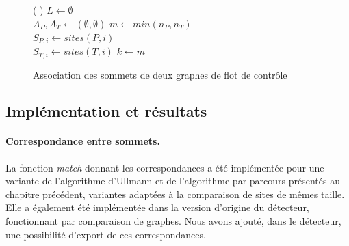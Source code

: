 \begin{figure}[h]
\begin{algorithm}[H]
\DontPrintSemicolon
\caption{Association des sommets de deux graphes de flot de contrôle}
\SetAlgoLined
{}
\Fn(
){}{
$L\leftarrow \emptyset$\\
$A_P, A_T \leftarrow (\emptyset, \emptyset)$ 
$m\leftarrow min(n_P, n_T)$\\
 {
  $S_{P, i}\leftarrow sites(P, i)$\\
  $S_{T, i}\leftarrow sites(T, i)$
}
$k\leftarrow m$\\
}
\label{algo:correspondance_fine}
\end{algorithm}
\end{figure}

\subsection{Implémentation et résultats}
\paragraph{Correspondance entre sommets.}
La fonction \emph{match} donnant les correspondances a été implémentée pour une variante de l'algorithme d'Ullmann et de l'algorithme par parcours présentés au chapitre précédent, variantes adaptées à la comparaison de sites de mêmes taille.
Elle a également été implémentée dans la version d'origine du détecteur, fonctionnant par comparaison de graphes.
Nous avons ajouté, dans le détecteur, une possibilité d'export de ces correspondances.

